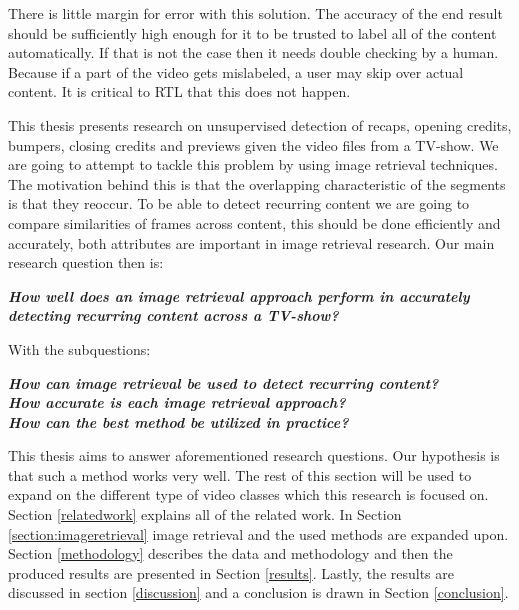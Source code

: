 \documentclass{article}
\begin{document}
There is little margin for error with this solution. The accuracy of the end result should be sufficiently high enough for it to be trusted to label all of the content automatically. If that is not the case then it needs double checking by a human. Because if a part of the video gets mislabeled, a user may skip over actual content. It is critical to RTL that this does not happen.

This thesis presents research on unsupervised detection of recaps, opening credits, bumpers, closing credits and previews given the video files from a TV-show. We are going to attempt to tackle this problem by using image retrieval techniques. The motivation behind this is that the overlapping characteristic of the segments is that they reoccur. To be able to detect recurring content we are going to compare similarities of frames across content, this should be done efficiently and accurately, both attributes are important in image retrieval research. Our main research question then is:
\newline
\begin{adjustwidth}{0.3in}{0.3in}
\textit{\textbf{How well does an image retrieval approach perform in accurately detecting recurring content across a TV-show?\newline}}
\end{adjustwidth}
With the subquestions: \\
\begin{adjustwidth}{0.3in}{0.3in}
	\textit{\textbf{How can image retrieval be used to detect recurring content?\newline}}\\
	\textit{\textbf{How accurate is each image retrieval approach?\newline}}\\
	\textit{\textbf{How can the best method be utilized in practice?\newline}}
\end{adjustwidth}
This thesis aims to answer aforementioned research questions. Our hypothesis is that such a method works very well. The rest of this section will be used to expand on the different type of video classes which this research is focused on. Section \ref{relatedwork} explains all of the related work. In Section \ref{section:imageretrieval} image retrieval and the used methods are expanded upon. Section \ref{methodology} describes the data and methodology and then the produced results are presented in Section \ref{results}. Lastly, the results are discussed in section \ref{discussion} and a conclusion is drawn in Section \ref{conclusion}.
\end{document}
